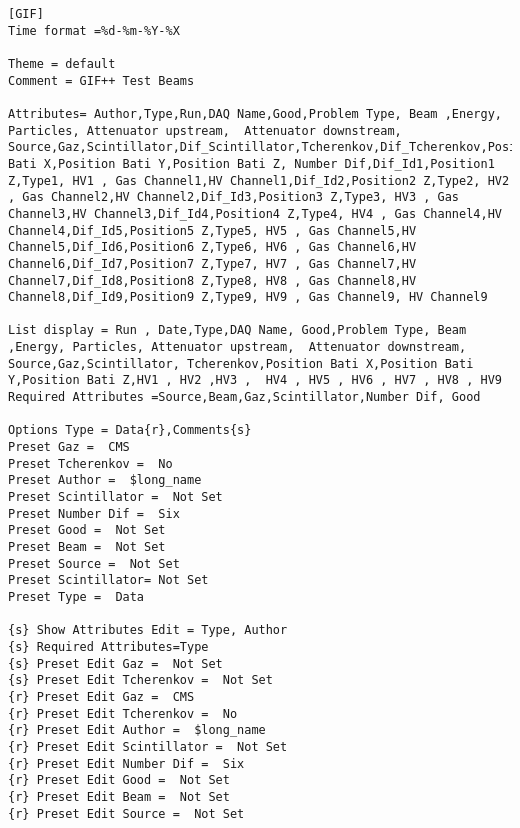 \fontsize{10}{10} \selectfont
{
\begin{lstlisting}[breaklines=true,basicstyle=\tiny,postbreak=\mbox{\textcolor{red}{$\hookrightarrow$}\space},]
[GIF]
Time format =%d-%m-%Y-%X

Theme = default
Comment = GIF++ Test Beams

Attributes= Author,Type,Run,DAQ Name,Good,Problem Type, Beam ,Energy, Particles, Attenuator upstream,  Attenuator downstream, Source,Gaz,Scintillator,Dif_Scintillator,Tcherenkov,Dif_Tcherenkov,Position Bati X,Position Bati Y,Position Bati Z, Number Dif,Dif_Id1,Position1 Z,Type1, HV1 , Gas Channel1,HV Channel1,Dif_Id2,Position2 Z,Type2, HV2 , Gas Channel2,HV Channel2,Dif_Id3,Position3 Z,Type3, HV3 , Gas Channel3,HV Channel3,Dif_Id4,Position4 Z,Type4, HV4 , Gas Channel4,HV Channel4,Dif_Id5,Position5 Z,Type5, HV5 , Gas Channel5,HV Channel5,Dif_Id6,Position6 Z,Type6, HV6 , Gas Channel6,HV Channel6,Dif_Id7,Position7 Z,Type7, HV7 , Gas Channel7,HV Channel7,Dif_Id8,Position8 Z,Type8, HV8 , Gas Channel8,HV Channel8,Dif_Id9,Position9 Z,Type9, HV9 , Gas Channel9, HV Channel9

List display = Run , Date,Type,DAQ Name, Good,Problem Type, Beam ,Energy, Particles, Attenuator upstream,  Attenuator downstream, Source,Gaz,Scintillator, Tcherenkov,Position Bati X,Position Bati Y,Position Bati Z,HV1 , HV2 ,HV3 ,  HV4 , HV5 , HV6 , HV7 , HV8 , HV9
Required Attributes =Source,Beam,Gaz,Scintillator,Number Dif, Good

Options Type = Data{r},Comments{s}
Preset Gaz =  CMS
Preset Tcherenkov =  No
Preset Author =  $long_name
Preset Scintillator =  Not Set
Preset Number Dif =  Six
Preset Good =  Not Set
Preset Beam =  Not Set
Preset Source =  Not Set
Preset Scintillator= Not Set
Preset Type =  Data

{s} Show Attributes Edit = Type, Author
{s} Required Attributes=Type
{s} Preset Edit Gaz =  Not Set
{s} Preset Edit Tcherenkov =  Not Set
{r} Preset Edit Gaz =  CMS
{r} Preset Edit Tcherenkov =  No
{r} Preset Edit Author =  $long_name
{r} Preset Edit Scintillator =  Not Set
{r} Preset Edit Number Dif =  Six
{r} Preset Edit Good =  Not Set
{r} Preset Edit Beam =  Not Set
{r} Preset Edit Source =  Not Set


\end{lstlisting}}
